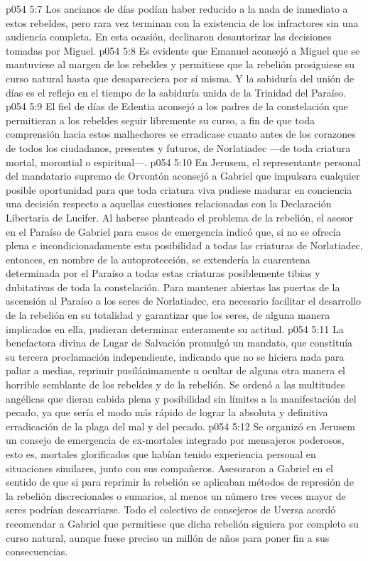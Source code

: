 \vs p054 5:7 Los ancianos de días podían haber reducido a la nada de inmediato a estos rebeldes, pero rara vez terminan con la existencia de los infractores sin una audiencia completa. En esta ocasión, declinaron desautorizar las decisiones tomadas por Miguel.
\vs p054 5:8 Es evidente que Emanuel aconsejó a Miguel que se mantuviese al margen de los rebeldes y permitiese que la rebelión prosiguiese su curso natural hasta que desapareciera por sí misma. Y la sabiduría del unión de días es el reflejo en el tiempo de la sabiduría unida de la Trinidad del Paraíso.
\vs p054 5:9 El fiel de días de Edentia aconsejó a los padres de la constelación que permitieran a los rebeldes seguir libremente su curso, a fin de que toda comprensión hacia estos malhechores se erradicase cuanto antes de los corazones de todos los ciudadanos, presentes y futuros, de Norlatiadec ---de toda criatura mortal, morontial o espiritual---.
\vs p054 5:10 En Jerusem, el representante personal del mandatario supremo de Orvontón aconsejó a Gabriel que impulsara cualquier posible oportunidad para que toda criatura viva pudiese madurar en conciencia una decisión respecto a aquellas cuestiones relacionadas con la Declaración Libertaria de Lucifer. Al haberse planteado el problema de la rebelión, el asesor en el Paraíso de Gabriel para casos de emergencia indicó que, si no se ofrecía plena e incondicionadamente esta posibilidad a todas las criaturas de Norlatiadec, entonces, en nombre de la autoprotección, se extendería la cuarentena determinada por el Paraíso a todas estas criaturas posiblemente tibias y dubitativas de toda la constelación. Para mantener abiertas las puertas de la ascensión al Paraíso a los seres de Norlatiadec, era necesario facilitar el desarrollo de la rebelión en su totalidad y garantizar que los seres, de alguna manera implicados en ella, pudieran determinar enteramente su actitud.
\vs p054 5:11 La benefactora divina de Lugar de Salvación promulgó un mandato, que constituía su tercera proclamación independiente, indicando que no se hiciera nada para paliar a medias, reprimir pusilánimamente u ocultar de alguna otra manera el horrible semblante de los rebeldes y de la rebelión. Se ordenó a las multitudes angélicas que dieran cabida plena y posibilidad sin límites a la manifestación del pecado, ya que sería el modo más rápido de lograr la absoluta y definitiva erradicación de la plaga del mal y del pecado.
\vs p054 5:12 Se organizó en Jerusem un consejo de emergencia de ex\hyp{}mortales integrado por mensajeros poderosos, esto es, mortales glorificados que habían tenido experiencia personal en situaciones similares, junto con sus compañeros. Asesoraron a Gabriel en el sentido de que si para reprimir la rebelión se aplicaban métodos de represión de la rebelión discrecionales o sumarios, al menos un número tres veces mayor de seres podrían descarriarse. Todo el colectivo de consejeros de Uversa acordó recomendar a Gabriel que permitiese que dicha rebelión siguiera por completo su curso natural, aunque fuese preciso un millón de años para poner fin a sus consecuencias.
